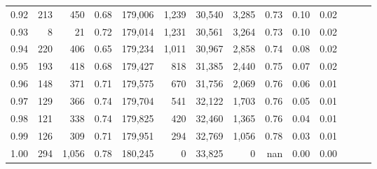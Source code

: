 \begin{tabular}{rrrrrrrrrrrrrr}
0.92 &    213 &    450 &  0.68 &  179,006 &    1,239 &  30,540 &   3,285 &  0.73 &  0.10 &      0.02 \\
0.93 &      8 &     21 &  0.72 &  179,014 &    1,231 &  30,561 &   3,264 &  0.73 &  0.10 &      0.02 \\
0.94 &    220 &    406 &  0.65 &  179,234 &    1,011 &  30,967 &   2,858 &  0.74 &  0.08 &      0.02 \\
0.95 &    193 &    418 &  0.68 &  179,427 &      818 &  31,385 &   2,440 &  0.75 &  0.07 &      0.02 \\
0.96 &    148 &    371 &  0.71 &  179,575 &      670 &  31,756 &   2,069 &  0.76 &  0.06 &      0.01 \\
0.97 &    129 &    366 &  0.74 &  179,704 &      541 &  32,122 &   1,703 &  0.76 &  0.05 &      0.01 \\
0.98 &    121 &    338 &  0.74 &  179,825 &      420 &  32,460 &   1,365 &  0.76 &  0.04 &      0.01 \\
0.99 &    126 &    309 &  0.71 &  179,951 &      294 &  32,769 &   1,056 &  0.78 &  0.03 &      0.01 \\
1.00 &    294 &  1,056 &  0.78 &  180,245 &        0 &  33,825 &       0 &   nan &  0.00 &      0.00 \\
\bottomrule
\end{tabular}
